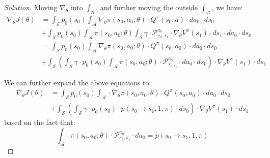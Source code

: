 \documentclass[12pt]{article}
\newenvironment{solution}
  {\renewcommand\qedsymbol{$\blacksquare$}\begin{proof}[Solution]}
  {\end{proof}}
\begin{document}
\begin{solution}
Moving $\nabla_{\theta}$ into $\int_{\mathcal{S}}$, and further moving the outside $\int_{\mathcal{A}}$, we have:
\begin{equation}
	\begin{aligned}
	\nabla_{\theta} J(\theta)
	&=\int_{\mathcal{S}} p_{0}\left(s_{0}\right) \int_{\mathcal{A}} \nabla_{\theta} \pi\left(s_{0}, a_{0} ; \theta\right) \cdot Q^{\pi}\left(s_{0}, a\right) \cdot d a_{0} \cdot d s_{0} \\
	&+\int_{\mathcal{S}} p_{0}\left(s_{0}\right) \int_{\mathcal{A}} \pi\left(s_{0}, a_{0} ; \theta\right) \int_{\mathcal{S}} \gamma \cdot \mathcal{P}_{s_{0}, s_{1}}^{a_{0}} \cdot \nabla_{\theta} V^{\pi}\left(s_{1}\right) \cdot d s_{1} \cdot d a_{0} \cdot d s_{0}\\
	&=\int_{\mathcal{S}} p_{0}\left(s_{0}\right) \int_{\mathcal{A}} \nabla_{\theta} \pi\left(s_{0}, a_{0} ; \theta\right) \cdot Q^{\pi}\left(s_{0}, a_{0}\right) \cdot d a_{0} \cdot d s_{0} \\
	&+\int_{\mathcal{S}}\left(\int_{\mathcal{S}} \gamma \cdot p_{0}\left(s_{0}\right) \int_{\mathcal{A}} \pi\left(s_{0}, a_{0} ; \theta\right) \cdot \mathcal{P}_{s_{0, s_{1}}}^{a_{0}} \cdot d a_{0} \cdot d s_{0}\right) \cdot \nabla_{\theta} V^{\pi}\left(s_{1}\right) \cdot d s_{1}
	\end{aligned}
\end{equation}

We can further expand the above equations to:
\begin{equation}
\begin{aligned}
\nabla_{\theta} J(\theta)
&=\int_{\mathcal{S}} p_{0}\left(s_{0}\right) \int_{\mathcal{A}} \cdot \nabla_{\theta} \pi\left(s_{0}, a_{0} ; \theta\right) \cdot Q^{\pi}\left(s_{0}, a_{0}\right) \cdot d a_{0} \cdot d s_{0} \\
&+\int_{\mathcal{S}}\left(\int_{\mathcal{S}} \gamma \cdot p_{0}\left(s_{0}\right) \cdot p\left(s_{0} \rightarrow s_{1}, 1, \pi\right) \cdot d s_{0}\right) \cdot \nabla_{\theta} V^{\pi}\left(s_{1}\right) \cdot d s_{1}
\end{aligned}
\end{equation}
based on the fact that:
\begin{equation}
\int_{\mathcal{A}} \pi\left(s_{0}, a_{0} ; \theta\right) \cdot \mathcal{P}_{s_{0}, s_{1}}^{a_{0}} \cdot d a_{0}=p\left(s_{0} \rightarrow s_{1}, 1, \pi\right)
\end{equation}


\end{solution}
\end{document}
